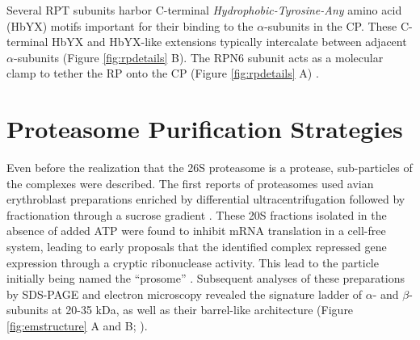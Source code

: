 Several RPT subunits harbor C-terminal \textit{Hydrophobic-Tyrosine-Any} amino acid (HbYX) motifs important for their binding to the $\alpha$-subunits in the CP. These C-terminal HbYX and HbYX-like extensions typically intercalate between adjacent $\alpha$-subunits (Figure \ref{fig:rpdetails} B). The RPN6 subunit acts as a molecular clamp to tether the RP onto the CP (Figure \ref{fig:rpdetails} A) \citep{pathare12}. 
	 
\section{Proteasome Purification Strategies}
	Even before the realization that the 26S proteasome is a protease, sub-particles of the complexes were described.  The first reports of proteasomes used avian erythroblast preparations enriched by differential ultracentrifugation followed by fractionation through a sucrose gradient \citep{schmid84}.  These 20S fractions isolated in the absence of added ATP were found to inhibit mRNA translation in a cell-free system, leading to early proposals that the identified complex repressed gene expression through a cryptic ribonuclease activity.  This lead to the particle initially being named the ``prosome'' \citep{kremp86, schmid84}.  Subsequent analyses of these preparations by SDS-PAGE and electron microscopy revealed the signature ladder of $\alpha$- and $\beta$-subunits at 20-35 kDa, as well as their barrel-like architecture (Figure \ref{fig:emstructure} A and B; \citep{baumeister88, kremp86, schmid84}).

